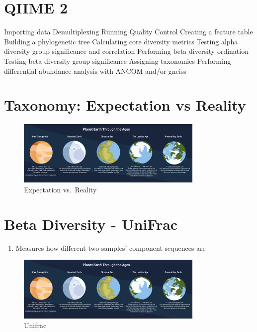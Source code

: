 \documentclass[
]{book}
\providecommand{\tightlist}{%
  \setlength{\itemsep}{0pt}\setlength{\parskip}{0pt}}
\begin{document}
\hypertarget{qiime-2}{%
\section{QIIME 2}\label{qiime-2}}

Importing data
Demultiplexing
Running Quality Control
Creating a feature table
Building a phylogenetic tree
Calculating core diversity metrics
Testing alpha diversity group significance and correlation
Performing beta diversity ordination
Testing beta diversity group significance
Assigning taxonomies
Performing differential abundance analysis with ANCOM and/or gneiss

\hypertarget{taxonomy-expectation-vs-reality}{%
\section{Taxonomy: Expectation vs Reality}\label{taxonomy-expectation-vs-reality}}

\begin{figure}
\centering
\includegraphics[width=0.8\textwidth,height=\textheight]{./Figures/Planets.png}
\caption{Expectation vs.~Reality}
\end{figure}

\hypertarget{beta-diversity---unifrac}{%
\section{Beta Diversity - UniFrac}\label{beta-diversity---unifrac}}

\begin{enumerate}
\def\labelenumi{\arabic{enumi}.}
\tightlist
\item
  Measures how different two samples' component sequences are
\end{enumerate}

\begin{figure}
\centering
\includegraphics[width=0.8\textwidth,height=\textheight]{./Figures/Planets.png}
\caption{Unifrac}
\end{figure}
\end{document}
